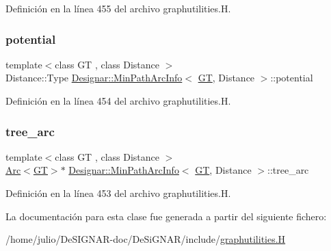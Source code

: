 Definición en la línea 455 del archivo graphutilities.\+H.

\mbox{\label{class_designar_1_1_min_path_arc_info_ae53cddd12f7488ab3daf3711963b533d}} 
\subsubsection{\texorpdfstring{potential}{potential}}
{\footnotesize\ttfamily template$<$class GT , class Distance $>$ \\
Distance\+::\+Type \hyperlink{class_designar_1_1_min_path_arc_info}{Designar\+::\+Min\+Path\+Arc\+Info}$<$ \hyperlink{demo-buildgraph_8_c_a3001c40d2c31ca87ed96cd7d1334a55e}{GT}, Distance $>$\+::potential}



Definición en la línea 454 del archivo graphutilities.\+H.

\mbox{\label{class_designar_1_1_min_path_arc_info_a2f5c165e547c75ec582dd3724a93137c}} 
\subsubsection{\texorpdfstring{tree\+\_\+arc}{tree\_arc}}
{\footnotesize\ttfamily template$<$class GT , class Distance $>$ \\
\hyperlink{namespace_designar_a3f55fb5513d62ff47cbc8f72b8e95d6f}{Arc}$<$\hyperlink{demo-buildgraph_8_c_a3001c40d2c31ca87ed96cd7d1334a55e}{GT}$>$$\ast$ \hyperlink{class_designar_1_1_min_path_arc_info}{Designar\+::\+Min\+Path\+Arc\+Info}$<$ \hyperlink{demo-buildgraph_8_c_a3001c40d2c31ca87ed96cd7d1334a55e}{GT}, Distance $>$\+::tree\+\_\+arc}



Definición en la línea 453 del archivo graphutilities.\+H.



La documentación para esta clase fue generada a partir del siguiente fichero\+:\begin{DoxyCompactItemize}
\item 
/home/julio/\+De\+S\+I\+G\+N\+A\+R-\/doc/\+De\+Si\+G\+N\+A\+R/include/\hyperlink{graphutilities_8_h}{graphutilities.\+H}\end{DoxyCompactItemize}
